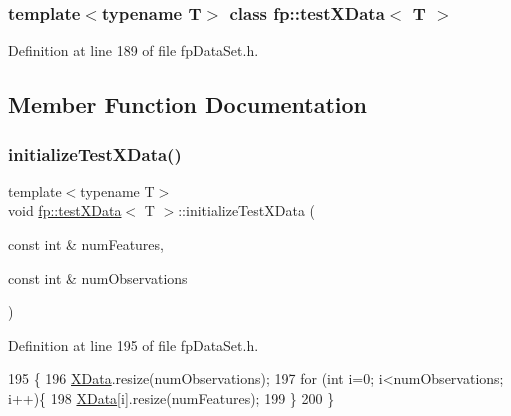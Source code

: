 \subsubsection*{template$<$typename T$>$\newline
class fp\+::test\+X\+Data$<$ T $>$}



Definition at line 189 of file fp\+Data\+Set.\+h.



\subsection{Member Function Documentation}
\mbox{\label{classfp_1_1testXData_ab0f2e34632495f758cc211f7a73faa8a}} 
\subsubsection{\texorpdfstring{initialize\+Test\+X\+Data()}{initializeTestXData()}}
{\footnotesize\ttfamily template$<$typename T$>$ \\
void \hyperlink{classfp_1_1testXData}{fp\+::test\+X\+Data}$<$ T $>$\+::initialize\+Test\+X\+Data (\begin{DoxyParamCaption}\item[{const int \&}]{num\+Features,  }\item[{const int \&}]{num\+Observations }\end{DoxyParamCaption})\hspace{0.3cm}{\ttfamily [inline]}}



Definition at line 195 of file fp\+Data\+Set.\+h.


\begin{DoxyCode}
195                                                                                      \{
196             \hyperlink{classfp_1_1testXData_a3a7fe96fa4c950d66be4e9e8faa70e9c}{XData}.resize(numObservations);
197             \textcolor{keywordflow}{for} (\textcolor{keywordtype}{int} i=0; i<numObservations; i++)\{
198                 \hyperlink{classfp_1_1testXData_a3a7fe96fa4c950d66be4e9e8faa70e9c}{XData}[i].resize(numFeatures);
199             \}
200         \}
\end{DoxyCode}
\mbox{\label{classfp_1_1testXData_afdecc334182bad0711305abc716ed359}} 
